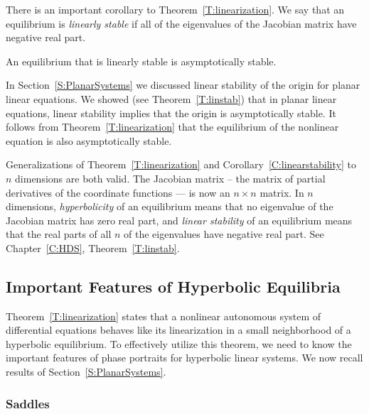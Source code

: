 \documentclass{ximera}
\begin{document}
There is an important corollary to Theorem~\ref{T:linearization}.
We say that an equilibrium is 
{\em linearly stable\/}
if all of the eigenvalues of the Jacobian matrix have negative real part.

\begin{cor} \label{C:linearstability}
An equilibrium that is linearly stable is asymptotically stable.
\end{cor}   

In Section~\ref{S:PlanarSystems} we discussed linear stability
of the origin for planar linear equations.  We showed (see
Theorem~\ref{T:linstab}) that in planar linear equations, linear
stability implies that the origin is asymptotically stable.  It
follows from Theorem~\ref{T:linearization} that the equilibrium
of the nonlinear equation is also asymptotically stable.  

\begin{rmk} 
Generalizations of Theorem~\ref{T:linearization} and 
Corollary~\ref{C:linearstability} to $n$ dimensions are both valid. 
{\rm The Jacobian matrix -- the matrix of partial 
derivatives of the coordinate functions --- is now an $n\times n$
matrix.  In $n$ dimensions, {\em hyperbolicity\/} 
of an equilibrium means that no eigenvalue of the Jacobian matrix has 
zero real part, and {\em linear stability\/} of an equilibrium means 
that the real parts of all $n$ of the eigenvalues have negative real 
part.  See Chapter~\ref{C:HDS}, Theorem~\ref{T:linstab}.}
\end{rmk}  

\subsection*{Important Features of Hyperbolic Equilibria}

Theorem~\ref{T:linearization} states that a nonlinear autonomous
system of differential equations behaves like its linearization 
in a small neighborhood of a hyperbolic equilibrium.  To effectively
utilize this theorem, we need to know the important features of phase 
portraits for hyperbolic linear systems.  We now recall results of 
Section~\ref{S:PlanarSystems}.

\subsubsection*{Saddles}  
\end{document}
